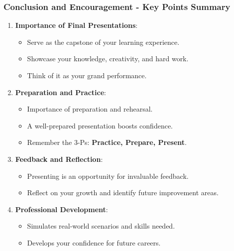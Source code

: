 \documentclass[aspectratio=169]{beamer}
\begin{document}
\begin{frame}[fragile]
  \frametitle{Conclusion and Encouragement - Key Points Summary}
  
  \begin{enumerate}
      \item \textbf{Importance of Final Presentations}:
          \begin{itemize}
              \item Serve as the capstone of your learning experience.
              \item Showcase your knowledge, creativity, and hard work.
              \item Think of it as your grand performance.
          \end{itemize}
      
      \item \textbf{Preparation and Practice}:
          \begin{itemize}
              \item Importance of preparation and rehearsal.
              \item A well-prepared presentation boosts confidence.
              \item Remember the 3-Ps: \textbf{Practice, Prepare, Present}.
          \end{itemize}
      
      \item \textbf{Feedback and Reflection}:
          \begin{itemize}
              \item Presenting is an opportunity for invaluable feedback.
              \item Reflect on your growth and identify future improvement areas.
          \end{itemize}
      
      \item \textbf{Professional Development}:
          \begin{itemize}
              \item Simulates real-world scenarios and skills needed.
              \item Develops your confidence for future careers.
          \end{itemize}
  \end{enumerate}
\end{frame}
\end{document}

